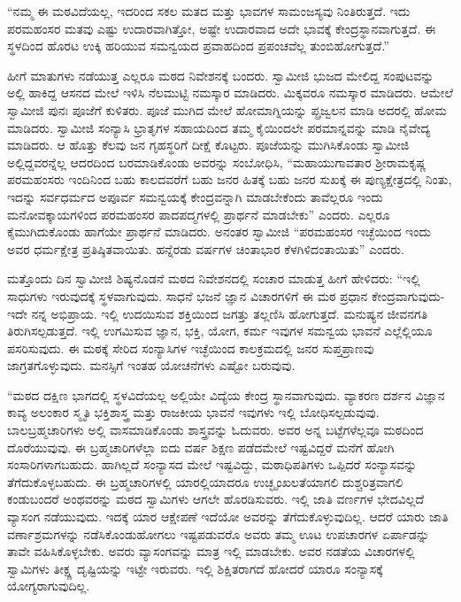  “ನಮ್ಮ ಈ ಮಠವಿದೆಯಲ್ಲ, ಇದರಿಂದ ಸಕಲ ಮತದ ಮತ್ತು ಭಾವಗಳ ಸಾಮಂಜಸ್ಯವು ನಿಂತಿರುತ್ತದೆ. ಇದು ಪರಮಹಂಸರ ಮತವು ಎಷ್ಟು ಉದಾರವಾಗಿತ್ತೋ, ಅಷ್ಟೇ ಉದಾರವಾದ ಅದೇ ಭಾವಕ್ಕೆ ಕೇಂದ್ರಸ್ಥಾನವಾಗುತ್ತದೆ. ಈ ಸ್ಥಳದಿಂದ ಹೊರಟ ಉಕ್ಕಿ ಹರಿಯುವ ಸಮನ್ವಯದ ಪ್ರವಾಹದಿಂದ ಪ್ರಪಂಚವೆಲ್ಲ ತುಂಬಿಹೋಗುತ್ತದೆ.” 

 ಹೀಗೆ ಮಾತುಗಳು ನಡೆಯುತ್ತ ಎಲ್ಲರೂ ಮಠದ ನಿವೇಶನಕ್ಕೆ ಬಂದರು. ಸ್ವಾಮೀಜಿ ಭುಜದ ಮೇಲಿದ್ದ ಸಂಪುಟವನ್ನು ಅಲ್ಲಿ ಹಾಕಿದ್ದ ಆಸನದ ಮೇಲೆ ಇಳಿಸಿ ನೆಲಮುಟ್ಟಿ ನಮಸ್ಕಾರ ಮಾಡಿದರು. ಮಿಕ್ಕವರೂ ನಮಸ್ಕಾರ ಮಾಡಿದರು. ಆಮೇಲೆ ಸ್ವಾಮೀಜಿ ಪುನಃ ಪೂಜೆಗೆ ಕುಳಿತರು. ಪೂಜೆ ಮುಗಿದ ಮೇಲೆ ಹೋಮಾಗ್ನಿಯನ್ನು ಪ್ಪ್ರಜ್ವಲನ ಮಾಡಿ ಅದರಲ್ಲಿ ಹೋಮ ಮಾಡಿದರು. ಸ್ವಾಮೀಜಿ ಸಂನ್ಯಾಸಿ ಭ್ರಾತೃಗಳ ಸಹಾಯದಿಂದ ತಮ್ಮ ಕೈಯಿಂದಲೇ ಪರಮಾನ್ನವನ್ನು ಮಾಡಿ ನೈವೇದ್ಯ ಮಾಡಿದರು. ಆ ಹೊತ್ತು ಕೆಲವು ಜನ ಗೃಹಸ್ಥರಿಗೆ ದೀಕ್ಷೆ ಕೊಟ್ಟರು. ಪೂಜೆಯನ್ನು ಮುಗಿಸಿಕೊಂಡು ಸ್ವಾಮೀಜಿ ಅಲ್ಲಿದ್ದವರನ್ನೆಲ್ಲ ಆದರದಿಂದ ಬರಮಾಡಿಕೊಂಡು ಅವರನ್ನು ಸಂಬೋಧಿಸಿ, “ಮಹಾಯುಗಾವತಾರ ಶ‍್ರೀರಾಮಕೃಷ್ಣ ಪರಮಹಂಸರು ಇಂದಿನಿಂದ ಬಹು ಕಾಲದವರೆಗೆ ಬಹು ಜನರ ಹಿತಕ್ಕೆ ಬಹು ಜನರ ಸುಖಕ್ಕೆ ಈ ಪುಣ್ಯಕ್ಷೇತ್ರದಲ್ಲಿ ನಿಂತು, ಇದನ್ನು ಸರ್ವಧರ್ಮದ ಅಪೂರ್ವ ಸಮನ್ವಯಕ್ಕೆ ಕೇಂದ್ರವನ್ನಾಗಿ ಮಾಡಬೇಕೆಂದು ತಾವೆಲ್ಲರೂ ಇಂದು ಮನೋವಕ್ಕಾಯಗಳಿಂದ ಪರಮಹಂಸರ ಪಾದಪದ್ಮಗಳಲ್ಲಿ ಪ್ರಾರ್ಥನೆ ಮಾಡಬೇಕು” ಎಂದರು. ಎಲ್ಲರೂ ಕೈಮುಗಿದುಕೊಂಡು ಹಾಗೆಯೇ ಪ್ರಾರ್ಥನೆ ಮಾಡಿದರು. ಅನಂತರ ಸ್ವಾಮೀಜಿ “ಪರಮಹಂಸರ ಇಚ್ಛೆಯಿಂದ ಇಂದು ಅವರ ಧರ್ಮಕ್ಷೇತ್ರ ಪ್ರತಿಷ್ಠಿತವಾಯಿತು. ಹನ್ನೆರಡು ವರ್ಷಗಳ ಚಿಂತಾಭಾರ ಕೆಳಗಿಳಿದಂತಾಯಿತು” ಎಂದರು. 

 ಮತ್ತೊಂದು ದಿನ ಸ್ವಾಮೀಜಿ ಶಿಷ್ಯನೊಡನೆ ಮಠದ ನಿವೇಶನದಲ್ಲಿ ಸಂಚಾರ ಮಾಡುತ್ತ ಹೀಗೆ ಹೇಳಿದರು: “ಇಲ್ಲಿ ಸಾಧುಗಳು ಇರುವುದಕ್ಕೆ ಸ್ಥಳವಾಗುವುದು. ಸಾಧನೆ ಭಜನೆ ಜ್ಞಾನ ವಿಚಾರಗಳಿಗೆ ಈ ಮಠ ಪ್ರಧಾನ ಕೇಂದ್ರವಾಗುವುದು- ಇದೇ ನನ್ನ ಅಭಿಪ್ರಾಯ. ಇಲ್ಲಿ ಉದಯಿಸುವ ಶಕ್ತಿಯಿಂದ ಜಗತ್ತು ತಲ್ಲಣಿಸಿ ಹೋಗುತ್ತದೆ. ಮನುಷ್ಯನ ಜೀವನಗತಿ ತಿರುಗಿಸಲ್ಪಡುತ್ತದೆ. ಇಲ್ಲಿ ಉಗಮಿಸುವ ಜ್ಞಾನ, ಭಕ್ತಿ, ಯೋಗ, ಕರ್ಮ ಇವುಗಳ ಸಮನ್ವಯ ಭಾವನೆ ಎಲ್ಲೆಲ್ಲಿಯೂ ಪಸರಿಸುವುದು. ಈ ಮಠಕ್ಕೆ ಸೇರಿದ ಸಂನ್ಯಾಸಿಗಳ ಇಚ್ಛೆಯಿಂದ ಕಾಲಕ್ರಮದಲ್ಲಿ ಜನರ ಸುಪ್ತಪ್ರಾಣವು ಜಾಗ್ರತಗೊಳ್ಳುವುದು. ಮನಸ್ಸಿಗೆ ಇಂತಹ ಯೋಚನೆಗಳು ಎಷ್ಟೋ ಬರುವುವು. 

 “ಮಠದ ದಕ್ಷಿಣ ಭಾಗದಲ್ಲಿ ಸ್ಥಳವಿದೆಯಲ್ಲ ಅಲ್ಲಿಯೇ ವಿದ್ಯೆಯ ಕೇಂದ್ರ ಸ್ಥಾನವಾಗುವುದು. ವ್ಯಾಕರಣ ದರ್ಶನ ವಿಜ್ಞಾನ ಕಾವ್ಯ ಅಲಂಕಾರ ಸ್ಮೃತಿ ಭಕ್ತಿಶಾಸ್ತ್ರ ಮತ್ತು ರಾಜಕೀಯ ಭಾವನೆ ಇವುಗಳು ಇಲ್ಲಿ ಬೋಧಿಸಲ್ಪಡುವುವು. ಬಾಲಬ್ರಹ್ಮಚಾರಿಗಳು ಅಲ್ಲಿ ವಾಸಮಾಡಿಕೊಂಡು ಶಾಸ್ತ್ರವನ್ನು ಓದುವರು. ಅವರ ಅನ್ನ ಬಟ್ಟೆಗಳೆಲ್ಲವೂ ಮಠದಿಂದ ದೊರೆಯುವುವು. ಈ ಬ್ರಹ್ಮಚಾರಿಗಳೆಲ್ಲಾ ಐದು ವರ್ಷ ಶಿಕ್ಷಣ ಪಡೆದಮೇಲೆ ಇಷ್ಟವಿದ್ದರೆ ಮನೆಗೆ ಹೋಗಿ ಸಂಸಾರಿಗಳಾಗಬಹುದು. ಹಾಗಿಲ್ಲದೆ ಸಂನ್ಯಾಸದ ಮೇಲೆ ಇಷ್ಟವಿದ್ದು, ಮಠಾಧಿಪತಿಗಳು ಒಪ್ಪಿದರೆ ಸಂನ್ಯಾಸವನ್ನು ತೆಗೆದುಕೊಳ್ಳಬಹುದು. ಈ ಬ್ರಹ್ಮಚಾರಿಗಳಲ್ಲಿ ಯಾರಲ್ಲಿಯಾದರೂ ಉಚ್ಛೃಂಖಲತೆಯಾಗಲಿ ದುಶ್ಚರಿತ್ರವಾಗಲಿ ಕಂಡುಬಂದರೆ ಅಂಥವರನ್ನು ಮಠದ ಸ್ವಾಮಿಗಳು ಆಗಲೇ‌ ಹೊರಡಿಸುವರು. ಇಲ್ಲಿ ಜಾತಿ ವರ್ಣಗಳ ಭೇದವಿಲ್ಲದೆ ವ್ಯಾಸಂಗ ನಡೆಯುವುದು. ಇದಕ್ಕೆ ಯಾರ ಆಕ್ಷೇಪಣೆ ಇದೆಯೋ ಅವರನ್ನು ತೆಗೆದುಕೊಳ್ಳುವುದಿಲ್ಲ. ಆದರೆ ಯಾರು ಜಾತಿ ವರ್ಣಾಶ್ರಮಗಳನ್ನು ನಡೆಸಿಕೊಂಡುಹೋಗಲು ಇಷ್ಟಪಡುವರೊ ಅವರು ತಮ್ಮ ಊಟ ಉಪಚಾರಗಳ ಏರ್ಪಾಡನ್ನು ತಾವೇ ವಹಿಸಿಕೊಳ್ಳಬೇಕು. ಅವರು ವ್ಯಾಸಂಗವನ್ನು ಮಾತ್ರ ಇಲ್ಲಿ ಮಾಡಬೇಕು. ಅವರ ನಡತೆಯ ವಿಚಾರಗಳಲ್ಲಿ ಸ್ವಾಮಿಗಳು ತೀಕ್ಷ್ಣ ದೃಷ್ಟಿಯನ್ನು ಇಟ್ಟೇ ಇರುವರು. ಇಲ್ಲಿ ಶಿಕ್ಷಿತರಾಗದೆ ಹೋದರೆ ಯಾರೂ ಸಂನ್ಯಾಸಕ್ಕೆ ಯೋಗ್ಯರಾಗುವುದಿಲ್ಲ. 

